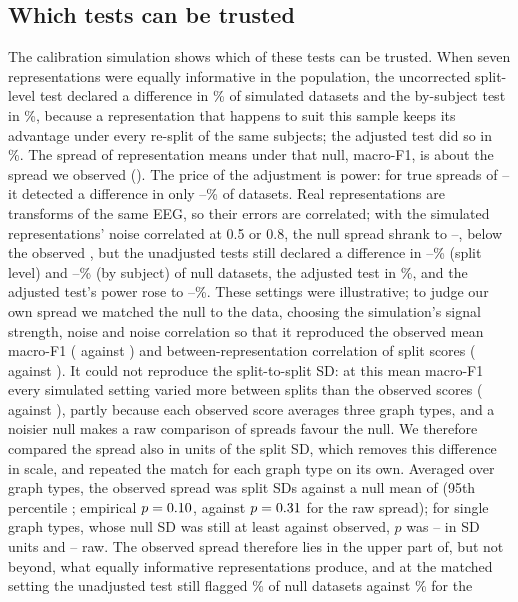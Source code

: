\subsection{Which tests can be trusted}\label{sec:res-calib}
The calibration simulation shows which of these tests can be trusted. When seven representations were
equally informative in the population, the uncorrected split-level test declared a difference in
\simNullUncorr\% of simulated datasets and the by-subject test in \simNullSubj\%, because a representation
that happens to suit this sample keeps its advantage under every re-split of the same subjects; the
adjusted test did so in \simNullNb\%. The spread of representation means under that null, \simNullRange{}
macro-F1, is about the spread we observed (\obsRepRange{}). The price of the adjustment is power: for
true spreads of \simAltRangeLo--\simAltRangeHi{} it detected a difference in only \simAltNbLo--\simAltNbHi\% of
datasets. Real representations are transforms of the same EEG, so their errors are correlated; with the
simulated representations' noise correlated at 0.5 or 0.8, the null spread shrank to
\simCorrRangeLo--\simCorrRangeHi{}, below the observed \obsRepRange{}, but the unadjusted tests still declared a
difference in \simCorrUncorrLo--\simCorrUncorrHi\% (split level) and \simCorrSubjLo--\simCorrSubjHi\% (by subject)
of null datasets, the adjusted test in \simCorrNb\%, and the adjusted test's power rose to
\simCorrNbPowLo--\simCorrNbPowHi\%. These settings were illustrative; to judge our own spread we matched the
null to the data, choosing the simulation's signal strength, noise and noise correlation so that it reproduced
the observed mean macro-F1 (\calMeanFOne{} against \calTargetFOne{}) and between-representation correlation of split scores (\calRepCorr{} against \calTargetCorr{}). It could not reproduce the split-to-split SD: at this mean macro-F1 every simulated setting varied more between splits than the observed scores (\calSplitSd{} against \calTargetSd{}), partly because each observed score averages three graph types, and a noisier null makes a raw comparison of spreads favour the null. We therefore compared the spread also in units of the split SD, which removes this difference in scale, and repeated the match for each graph type on its own. Averaged over graph types, the observed spread was \calStdObs{} split SDs against a null mean of \calStdNullMean{} (95th percentile \calStdQ{}; empirical $p=0.10$, against $p=0.31$ for the raw spread); for single graph types, whose null SD was still at least \calEdgeSdLo{} against \calTargetSdSpatial{} observed, $p$ was \calEdgeStdPLo--\calEdgeStdPHi{} in SD units and \calEdgeRawPLo--\calEdgeRawPHi{} raw. The observed spread therefore lies in the upper part of, but not beyond, what equally informative representations produce, and at the matched setting the unadjusted test still flagged \calFpUncorr\% of null datasets against \calFpNb\% for the
